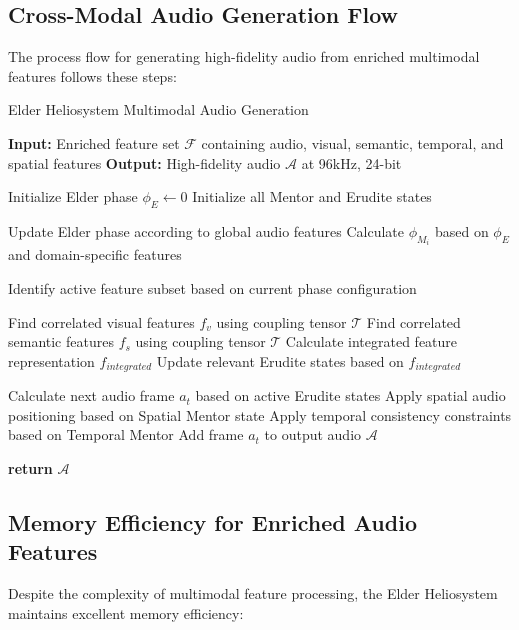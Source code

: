 \subsection{Cross-Modal Audio Generation Flow}

The process flow for generating high-fidelity audio from enriched multimodal features follows these steps:

\begin{algorithm}
\caption{Elder Heliosystem Multimodal Audio Generation}
\begin{algorithmic}[1]
\State \textbf{Input:} Enriched feature set $\mathcal{F}$ containing audio, visual, semantic, temporal, and spatial features
\State \textbf{Output:} High-fidelity audio $\mathcal{A}$ at 96kHz, 24-bit

\State Initialize Elder phase $\phi_E \gets 0$
\State Initialize all Mentor and Erudite states

    \State Update Elder phase according to global audio features
        \State Calculate $\phi_{M_i}$ based on $\phi_E$ and domain-specific features
    \EndFor
    
    \State Identify active feature subset based on current phase configuration
    
        \State Find correlated visual features $f_v$ using coupling tensor $\mathcal{T}$
        \State Find correlated semantic features $f_s$ using coupling tensor $\mathcal{T}$
        \State Calculate integrated feature representation $f_{integrated}$
        \State Update relevant Erudite states based on $f_{integrated}$
    \EndFor
    
    \State Calculate next audio frame $a_t$ based on active Erudite states
    \State Apply spatial audio positioning based on Spatial Mentor state
    \State Apply temporal consistency constraints based on Temporal Mentor
    \State Add frame $a_t$ to output audio $\mathcal{A}$
\EndFor

\State \textbf{return} $\mathcal{A}$
\end{algorithmic}
\end{algorithm}

\subsection{Memory Efficiency for Enriched Audio Features}

Despite the complexity of multimodal feature processing, the Elder Heliosystem maintains excellent memory efficiency:

